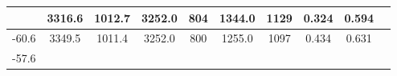 \documentclass[a4paper,12pt]{article}
\begin{document}
\begin{longtable}{
     |
%    
    c|
%    
    c|
%    
    c|
%    
    c|
%    
    c|
%    
    c|
%    
    c|
%    
    c|
%    
    c|
%    
    c|
%    
    }
%        
        & 3316.6
%        

%        

%        
        & 1012.7
%        

%        

%        
        & 3252.0
%        

%        

%        
        & 804
%        

%        

%        
        & 1344.0
%        

%        

%        
        & 1129
%        

%        

%        
        & 0.324
%        

%        

%        
        & 0.594
%        

%        
        \\
        \hline

        

%        

%        
        -60.6
%        

%        

%        
        & 3349.5
%        

%        

%        
        & 1011.4
%        

%        

%        
        & 3252.0
%        

%        

%        
        & 800
%        

%        

%        
        & 1255.0
%        

%        

%        
        & 1097
%        

%        

%        
        & 0.434
%        

%        

%        
        & 0.631
%        

%        
        \\
        \hline

        

%        

%        
        -57.6
%        

%        


\end{longtable}
\end{document}
